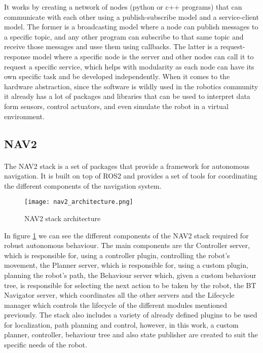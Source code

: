 It works by creating a network of nodes (python or c++ programs) that can communicate with each other 
using a publish-subscribe model and a service-client model. The former is a broadcasting 
model where a node can publish messages to a specific topic, and any other 
program can subscribe to that same topic and receive those messages and usse them using callbacks. 
The latter is a request-response model where a specific node is the server and other 
nodes can call it to request a specific service, which helps with modularity 
as each node can have its own specific task and be developed independently. When it comes to 
the hardware abstraction, since the software is wildly used in the robotics community 
it already has a lot of packages and libraries that can be used to interpret data form 
sensors, control actuators, and even simulate the robot in a virtual environment.


\subsection{NAV2}
\label{subsec:navigation2}
\paragraph{}The \gls{NAV2} stack is a set of packages that provide a framework for autonomous navigation. 
It is built on top of \gls{ROS2} and provides a set of tools for coordinating the different components of 
the navigation system.
\begin{figure}[h]
    \centering
    \texttt{[image: nav2\_architecture.png]}
    \caption{NAV2 stack architecture \cite{nav2_architecture}}
    \label{fig:nav2_stack}
\end{figure}

In figure \ref{fig:nav2_stack} we can see the different components of the \gls{NAV2} stack required for 
robust autonomous behaviour. The main components are thr Controller server, which is responsible for, using a controller 
plugin, controlling the robot's movement, the Planner server, which is responsible for, using a custom plugin, 
planning the robot's path, the Behaviour server which, given a custom behaviour tree, is responsible for selecting the 
next action to be taken by the robot, the BT Navigator server, which coordinates all the other servers and the Lifecycle manager 
which controls the lifecycle of the different modules mentioned previously. The stack also includes a variety of already 
defined plugins to be used for localization, path planning and control, however, in this work, a custom planner, controller, 
behaviour tree and also state publisher are created to suit the specific needs of the robot.

